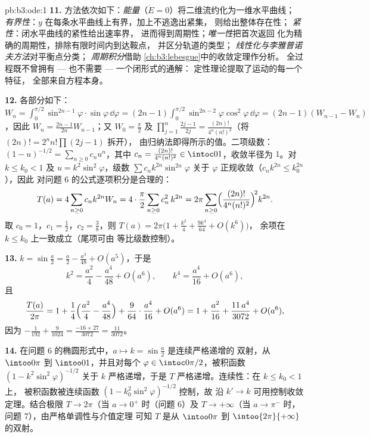 \begin{solution}{pb:b3:ode:1}
\textbf{11.} 方法依次如下：\emph{能量}（$\dot E =
0$）将二维流约化为一维水平曲线；
\emph{有界性}：$y$ 在每条水平曲线上有界，加上不逃逸出紧集，
则给出整体存在性；
\emph{紧性}：闭水平曲线的紧性给出速率界，
进而得到周期性；\emph{唯一性}把首次返回
化为精确的周期性，排除有限时间内到达鞍点，
并区分轨道的类型；
\emph{线性化与李雅普诺夫方法}对平衡点分类；
\emph{周期积分}借助
\cref{ch:b3:lebesgue}中的收敛定理作分析。
全过程既不曾拥有 --- 也不需要 --- 一个闭形式的通解：
定性理论提取了运动的每一个特征，
全部来自方程本身。

\textbf{12.} 各部分如下：$W_n = \int_0^{\pi/2}\sin^{2n-1}\varphi
\cdot\sin\varphi\,\dd\varphi = (2n-1)\int_0^{\pi/2}
\sin^{2n-2}\varphi\cos^2\varphi\,\dd\varphi = (2n-1)(W_{n-1}
- W_n)$，因此 $W_n = \frac{2n-1}{2n}W_{n-1}$；又 $W_0 =
\frac\pi2$ 及 $\prod_{j=1}^n\frac{2j-1}{2j} =
\frac{(2n)!}{4^n(n!)^2}$（将 $(2n)! = 2^nn!\prod(2j-1)$ 拆开），
由归纳法即得所示的值。二项级数：$(1 -
u)^{-1/2} = \sum_{n\geq0}c_nu^n$，其中 $c_n =
\frac{(2n)!}{4^n(n!)^2} \in \intoc01$，收敛半径为 $1$。对 $k
\leq k_0 < 1$ 及 $u = k^2\sin^2\varphi$，级数
$\sum c_nk^{2n}\sin^{2n}\varphi$ 关于
$\varphi$ 正规收敛（$c_nk^{2n} \leq k_0^{2n}$），因此
对问题 6 的公式逐项积分是合理的：
\[
T(a) = 4\sum_{n\geq0}c_nk^{2n}W_n
= 4\cdot\frac\pi2\sum_{n\geq0}c_n^2\,k^{2n}
= 2\pi\sum_{n\geq0}
\Bigl(\frac{(2n)!}{4^n(n!)^2}\Bigr)^{\!2}k^{2n} .
\]
取 $c_0 = 1$，$c_1 = \frac12$，$c_2 = \frac38$，则 $T(a) =
2\pi\bigl(1 + \frac{k^2}4 + \frac{9k^4}{64} + O(k^6)\bigr)$，
余项在 $k \leq k_0$ 上一致成立（尾项可由
等比级数控制）。

\textbf{13.} $k = \sin\frac a2 = \frac a2 - \frac{a^3}{48} +
O(a^5)$，于是
\[
k^2 = \frac{a^2}4 - \frac{a^4}{48} + O(a^6),
\qquad
k^4 = \frac{a^4}{16} + O(a^6) ,
\]
且
\[
\frac{T(a)}{2\pi} = 1 + \frac14\Bigl(\frac{a^2}4 -
\frac{a^4}{48}\Bigr) + \frac9{64}\cdot\frac{a^4}{16} +
O(a^6)
= 1 + \frac{a^2}{16} + \frac{11\,a^4}{3072} + O(a^6) ,
\]
因为 $-\frac1{192} + \frac9{1024} = \frac{-16 + 27}{3072}
= \frac{11}{3072}$。

\textbf{14.} 在问题 6 的椭圆形式中，$a \mapsto
k = \sin\frac a2$ 是连续严格递增的
双射，从 $\intoo0\pi$ 到 $\intoo01$，并且对每个
$\varphi \in \intoc0{\pi/2}$，被积函数 $(1 -
k^2\sin^2\varphi)^{-1/2}$ 关于 $k$ 严格递增，于是 $T$
严格递增。连续性：在 $k \leq k_0 < 1$ 上，
被积函数被连续函数 $(1 -
k_0^2\sin^2\varphi)^{-1/2}$ 控制，故
沿 $k' \to k$ 可用控制收敛定理。结合极限 $T \to 2\pi$（当 $a
\to 0^+$ 时（问题 6）及 $T \to +\infty$（当 $a \to \pi^-$
时，问题 7），由严格单调性与介值定理
可知 $T$ 是从 $\intoo0\pi$ 到
$\intoo{2\pi}{+\infty}$ 的双射。


\end{solution}
